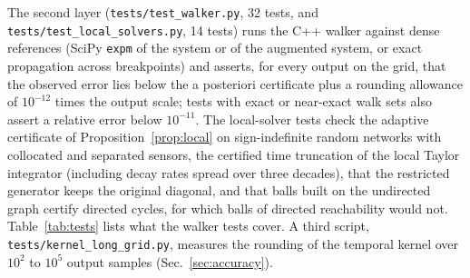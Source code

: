 \documentclass[aps,pra,superscriptaddress,floatfix,longbibliography,twocolumn]{revtex4-2}
\begin{document}
The second layer (\texttt{tests/test\_walker.py}, 32 tests, and \texttt{tests/test\_local\_solvers.py}, 14 tests) runs the C++ walker against dense references (SciPy \texttt{expm} of the system or of the augmented system, or exact propagation across breakpoints) and asserts, for every output on the grid, that the observed error lies below the a posteriori certificate plus a rounding allowance of $10^{-12}$ times the output scale; tests with exact or near-exact walk sets also assert a relative error below $10^{-11}$. The local-solver tests check the adaptive certificate of Proposition~\ref{prop:local} on sign-indefinite random networks with collocated and separated sensors, the certified time truncation of the local Taylor integrator (including decay rates spread over three decades), that the restricted generator keeps the original diagonal, and that balls built on the undirected graph certify directed cycles, for which balls of directed reachability would not. Table~\ref{tab:tests} lists what the walker tests cover. A third script, \texttt{tests/kernel\_long\_grid.py}, measures the rounding of the temporal kernel over $10^2$ to $10^5$ output samples (Sec.~\ref{sec:accuracy}).
\end{document}
